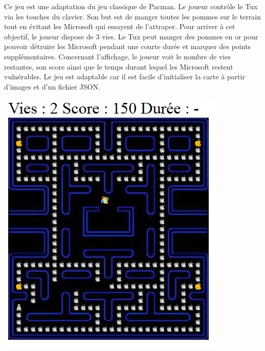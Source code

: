 \begin{minipage}{9cm}
Ce jeu est une adaptation du jeu classique de Pacman. 
Le joueur contrôle le Tux via les touches du clavier. 
Son but est de manger toutes les pommes sur le terrain tout en évitant les Microsoft qui essayent de l’attraper. 
Pour arriver à cet objectif, le joueur dispose de 3 vies. Le Tux peut manger des pommes en or pour pouvoir détruire les Microsoft pendant
une courte durée et marquer des points supplémentaires. Concernant l’affichage, le joueur voit le nombre de vies restantes, 
son score ainsi que le temps durant lequel les Microsoft restent vulnérables. Le jeu est adaptable car il est facile d'initialiser 
la carte à partir d’images et d’un fichier JSON.
\end{minipage}
\hfill
\begin{minipage}{6cm}
 \includegraphics[width=\linewidth]{img/capturejeu_pacman}
\end{minipage}


